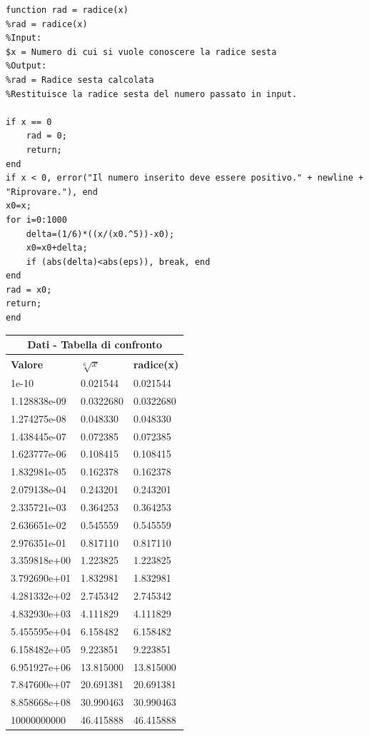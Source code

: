 \documentclass[10pt,a4paper]{article}
\begin{document}
\begin{lstlisting}[style=Matlab-editor]
function rad = radice(x)
%rad = radice(x)
%Input: 
$x = Numero di cui si vuole conoscere la radice sesta
%Output:
%rad = Radice sesta calcolata
%Restituisce la radice sesta del numero passato in input.
  
if x == 0
    rad = 0;
    return;
end
if x < 0, error("Il numero inserito deve essere positivo." + newline + "Riprovare."), end
x0=x;
for i=0:1000
    delta=(1/6)*((x/(x0.^5))-x0);
    x0=x0+delta;
    if (abs(delta)<abs(eps)), break, end 
end
rad = x0;
return;
end
\end{lstlisting}
\begin{center}
  \begin{tabular}{ |p{2.7cm}||p{2.7cm}|p{2.7cm}| }
    \hline
    \multicolumn{3}{|c|}{ \textbf{Dati - Tabella di confronto}} \\
    \hline
    \textbf{Valore} & $ \sqrt[6]{x} $ & \textbf{radice(x)}      \\
    \hline
    1e-10           & 0.021544        & 0.021544                \\
    1.128838e-09    & 0.0322680       & 0.0322680               \\
    1.274275e-08    & 0.048330        & 0.048330                \\
    1.438445e-07    & 0.072385        & 0.072385                \\
    1.623777e-06    & 0.108415        & 0.108415                \\
    1.832981e-05    & 0.162378        & 0.162378                \\
    2.079138e-04    & 0.243201        & 0.243201                \\
    2.335721e-03    & 0.364253        & 0.364253                \\
    2.636651e-02    & 0.545559        & 0.545559                \\
    2.976351e-01    & 0.817110        & 0.817110                \\
    3.359818e+00    & 1.223825        & 1.223825                \\
    3.792690e+01    & 1.832981        & 1.832981                \\
    4.281332e+02    & 2.745342        & 2.745342                \\
    4.832930e+03    & 4.111829        & 4.111829                \\
    5.455595e+04    & 6.158482        & 6.158482                \\
    6.158482e+05    & 9.223851        & 9.223851                \\
    6.951927e+06    & 13.815000       & 13.815000               \\
    7.847600e+07    & 20.691381       & 20.691381               \\
    8.858668e+08    & 30.990463       & 30.990463               \\
    10000000000     & 46.415888       & 46.415888               \\
    \hline
  \end{tabular}
\end{center}
\end{document}
